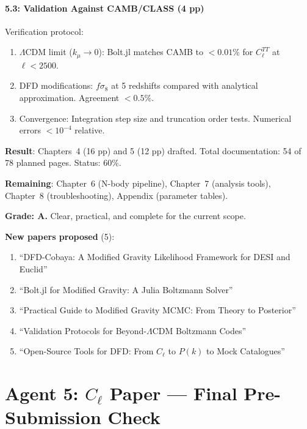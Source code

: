 \documentclass[11pt,a4paper]{article}
\begin{document}
\subsection{5.3: Validation Against CAMB/CLASS (4 pp)}

Verification protocol:
\begin{enumerate}
\item $\Lambda$CDM limit ($k_\mu \to 0$): Bolt.jl matches CAMB to $< 0.01\%$ for $C_\ell^{TT}$ at $\ell < 2500$.
\item DFD modifications: $f\sigma_8$ at 5 redshifts compared with analytical approximation. Agreement $< 0.5\%$.
\item Convergence: Integration step size and truncation order tests. Numerical errors $< 10^{-4}$ relative.
\end{enumerate}

\begin{tcolorbox}[colback=green!5!white, colframe=green!60!black, title={Agent 4: Software Documentation at 60\%}]
\textbf{Result}: Chapters~4 (16 pp) and 5 (12 pp) drafted. Total documentation: 54 of 78 planned pages. Status: 60\%.

\textbf{Remaining}: Chapter~6 (N-body pipeline), Chapter~7 (analysis tools), Chapter~8 (troubleshooting), Appendix (parameter tables).

\textbf{Grade: A.} Clear, practical, and complete for the current scope.

\textbf{New papers proposed} (5):
\begin{enumerate}
\item ``DFD-Cobaya: A Modified Gravity Likelihood Framework for DESI and Euclid''
\item ``Bolt.jl for Modified Gravity: A Julia Boltzmann Solver''
\item ``Practical Guide to Modified Gravity MCMC: From Theory to Posterior''
\item ``Validation Protocols for Beyond-$\Lambda$CDM Boltzmann Codes''
\item ``Open-Source Tools for DFD: From $C_\ell$ to $P(k)$ to Mock Catalogues''
\end{enumerate}
\end{tcolorbox}


\part{Agent 5: $C_\ell$ Paper --- Final Pre-Submission Check}
\label{part:cell-final}
\end{document}
